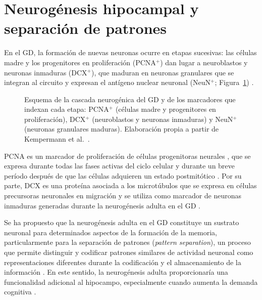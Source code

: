 \section{Neurogénesis hipocampal y separación de patrones}\label{sec:cascada}

En el GD, la formación de nuevas neuronas ocurre en etapas sucesivas: las células madre y los progenitores en proliferación (PCNA$^{+}$) dan lugar a neuroblastos y neuronas inmaduras (DCX$^{+}$), que maduran en neuronas granulares que se integran al circuito y expresan el antígeno nuclear neuronal (NeuN$^{+}$; Figura~\ref{fig:cascada-neurogenica}) \cite{kempermann2015neurogenesis}.

\begin{figure}[htbp]
  \centering
  \caption[Esquema de la cascada neurogénica del GD]{Esquema de la cascada neurogénica del GD y de los marcadores que indexan cada etapa: PCNA$^{+}$ (células madre y progenitores en proliferación), DCX$^{+}$ (neuroblastos y neuronas inmaduras) y NeuN$^{+}$ (neuronas granulares maduras). Elaboración propia a partir de Kempermann et al.~\cite{kempermann2015neurogenesis}.}
  \label{fig:cascada-neurogenica}
\end{figure}

PCNA es un marcador de proliferación de células progenitoras neurales \cite{eisch2007beyond,mandyam2007precursor}, que se expresa durante todas las fases activas del ciclo celular y durante un breve período después de que las células adquieren un estado postmitótico \cite{reichelt2016sucrose}. Por su parte, DCX es una proteína asociada a los microtúbulos que se expresa en células precursoras neuronales en migración \cite{gleeson1999dcx,francis1999dcx} y se utiliza como marcador de neuronas inmaduras generadas durante la neurogénesis adulta en el GD \cite{brown2003dcx,couillard2005dcx}.

Se ha propuesto que la neurogénesis adulta en el GD constituye un sustrato neuronal para determinados aspectos de la formación de la memoria, particularmente para la separación de patrones (\textit{pattern separation}), un proceso que permite distinguir y codificar patrones similares de actividad neuronal como representaciones diferentes durante la codificación y el almacenamiento de la información \cite{reichelt2016sucrose,reichelt2021slr}. En este sentido, la neurogénesis adulta proporcionaría una funcionalidad adicional al hipocampo, especialmente cuando aumenta la demanda cognitiva \cite{reichelt2016sucrose,reichelt2021slr}.

